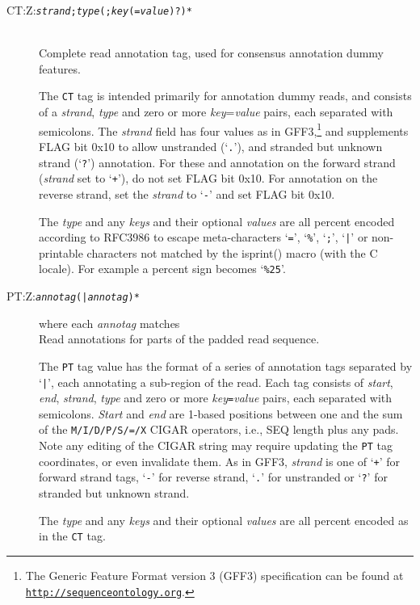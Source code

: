 \documentclass[10pt]{article}
\newcommand{\tagregex}[1]{{\tt #1}}
\newcommand{\metavar}[1]{{\rm\emph{#1}}}
\begin{document}
\begin{description}
\item[CT:Z:\tagregex{\metavar{strand};\metavar{type}(;\metavar{key}(=\metavar{value})?)*}]
\hfill\\
Complete read annotation tag, used for consensus annotation dummy features.

The {\tt CT} tag is intended primarily for annotation
dummy reads, and consists of a \emph{strand}, \emph{type} and zero or
more \emph{key}=\emph{value} pairs, each separated with semicolons.
The \emph{strand} field has four values as in GFF3,\footnote{The
Generic Feature Format version 3 (GFF3) specification can be found at
\href{http://www.sequenceontology.org/}{\tt http://sequenceontology.org}.}
and supplements FLAG
bit 0x10 to allow unstranded (`{\tt .}'), and stranded but unknown strand
(`{\tt ?}') annotation. For these and annotation on the forward strand
(\emph{strand} set to `{\tt +}'), do not set FLAG bit 0x10. For
annotation on the reverse strand, set the \emph{strand} to `{\tt -}'
and set FLAG bit 0x10.

The \emph{type} and any \emph{keys} and their
optional \emph{values} are all percent encoded according to
RFC3986 to escape meta-characters `{\tt =}', `{\tt \%}', `{\tt ;}',
`{\tt |}' or non-printable characters not matched by the isprint()
macro (with the C locale). For example a percent sign becomes
`{\tt \%25}'.

\item[PT:Z:\tagregex{\metavar{annotag}(|\metavar{annotag})*}]\enskip where each \metavar{annotag} matches\quad\tagregex{\metavar{start};\metavar{end};\metavar{strand};\metavar{type}(;\metavar{key}(=\metavar{value})?)*}
\hfill\\
Read annotations for parts of the padded read sequence.

The {\tt PT} tag value has the format of a series of annotation
tags separated by `{\tt |}', each annotating a sub-region of the read.
Each tag consists of \emph{start}, \emph{end}, \emph{strand},
\emph{type} and zero or more \emph{key}{\tt =}\emph{value} pairs, each
separated with semicolons. \emph{Start} and \emph{end} are 1-based
positions between one and the sum of the {\tt M/I/D/P/S/=/X}
{\sf CIGAR} operators, i.e., {\sf SEQ} length plus any pads.  Note
any editing of the CIGAR string may require updating the {\tt PT}
tag coordinates, or even invalidate them.
As in GFF3, \emph{strand} is one of `{\tt +}' for forward strand tags,
`{\tt -}' for reverse strand, `{\tt .}' for unstranded or `{\tt ?}'
for stranded but unknown strand.

The \emph{type} and any \emph{keys} and their optional \emph{values}
are all percent encoded as in the {\tt CT} tag.
\end{description}
\end{document}
